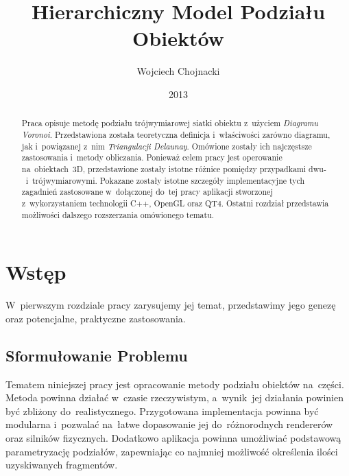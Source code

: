 \documentclass[skorowidz,autorrok,backref,xodstep,oswiadczenie]{wmimgr}
\author   {Wojciech Chojnacki}
\title    {Hierarchiczny Model Podziału Obiektów}
\date     {2013}
\begin{document}
\nocite{*} %

\begin{abstract}

Praca opisuje metodę podziału trójwymiarowej siatki obiektu z~użyciem \emph{Diagramu Voronoi}. Przedstawiona została teoretyczna definicja i~właściwości zarówno diagramu, jak i~powiązanej z~nim \emph{Triangulacji Delaunay}. Omówione zostały ich najczęstsze zastosowania i~metody obliczania. Ponieważ celem pracy jest operowanie na~obiektach~3D, przedstawione zostały istotne różnice pomiędzy przypadkami dwu-~i~trójwymiarowymi. Pokazane zostały istotne szczegóły implementacyjne tych zagadnień zastosowane w~dołączonej do~tej pracy aplikacji stworzonej z~wykorzystaniem technologii C++, OpenGL oraz QT4. Ostatni rozdział przedstawia możliwości dalszego rozszerzania omówionego tematu.

\end{abstract}

\maketitle

%
%
\listoffigures

%

%
\chapter{Wstęp}

W~pierwszym rozdziale pracy zarysujemy jej temat, przedstawimy jego genezę oraz potencjalne, praktyczne zastosowania.

\section{Sformułowanie Problemu}

Tematem niniejszej pracy jest opracowanie metody podziału obiektów na~części. Metoda powinna działać w~czasie rzeczywistym, a~wynik~jej działania powinien być zbliżony do~realistycznego. Przygotowana implementacja powinna być modularna i~pozwalać na~łatwe dopasowanie jej do~różnorodnych rendererów oraz silników fizycznych. Dodatkowo aplikacja powinna umożliwiać podstawową parametryzację podziałów, zapewniając co najmniej możliwość określenia ilości uzyskiwanych fragmentów.
\end{document}
